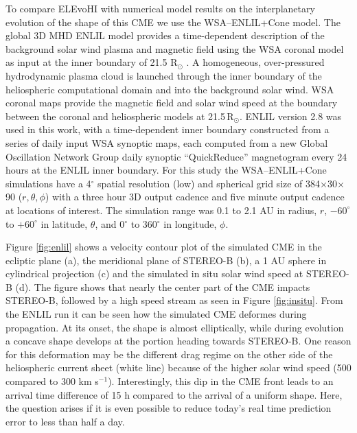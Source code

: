 \documentclass[draft]{agujournal}
\begin{document}
To compare ELEvoHI with numerical model results on the interplanetary evolution of the shape of this CME we use the WSA--ENLIL+Cone model. The global 3D MHD ENLIL model provides a time-dependent description of the background solar wind plasma and magnetic field using the WSA coronal model \citep{argpiz00,arg04} as input at the inner boundary of 21.5 R$_{\odot}$ \citep{ods96,ods99a,ods99b,ods03,ods04}. A homogeneous, over-pressured hydrodynamic plasma cloud is launched through the inner boundary of the heliospheric computational domain and into the background solar wind. WSA coronal maps provide the magnetic field and solar wind speed at the boundary between the coronal and heliospheric models at 21.5\,R$_{\odot}$. ENLIL version 2.8 was used in this work, with a time-dependent inner boundary constructed from a series of daily input WSA synoptic maps, each computed from a new Global Oscillation Network Group \citep[GONG:][]{har96} daily synoptic ``QuickReduce'' magnetogram every 24 hours at the ENLIL inner boundary. For this study the WSA--ENLIL+Cone simulations have a 4$^{\circ}$ spatial resolution (low) and spherical grid size of 384$\times$30$\times$90 ($r,\theta,\phi$) with a three hour 3D output cadence and five minute output cadence at locations of interest. The simulation range was 0.1 to 2.1 AU in radius, $r$, $-60^{\circ}$ to $+60^{\circ}$ in latitude, $\theta$, and 0$^{\circ}$ to 360$^{\circ}$ in longitude, $\phi$. 

Figure \ref{fig:enlil} shows a velocity contour plot of the simulated CME in the ecliptic plane (a), the meridional plane of STEREO-B (b), a 1 AU sphere in cylindrical projection (c) and the simulated in situ solar wind speed at STEREO-B (d). The figure shows that nearly the center part of the CME impacts STEREO-B, followed by a high speed stream as seen in Figure \ref{fig:insitu}.
From the ENLIL run it can be seen how the simulated CME deformes during propagation. At its onset, the shape is almost elliptically, while during evolution a concave shape develops at the portion heading towards STEREO-B. One reason for this deformation may be the different drag regime on the other side of the heliospheric current sheet (white line) because of the higher solar wind speed (500 compared to 300 km s$^{-1}$). Interestingly, this dip in the CME front leads to an arrival time difference of 15 h compared to the arrival of a uniform shape. Here, the question arises if it is even possible to reduce today's real time prediction error to less than half a day.
\end{document}
